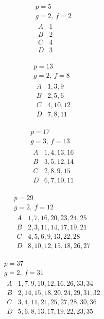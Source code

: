 \[
\begin{gathered}
p=5\\
g=2,\ f=2\\[3pt]
\begin{array}{c|l}
A&1\\
B&2\\
C&4\\
D&3
\end{array}
\end{gathered}
\]

\[
\begin{gathered}
p=13\\
g=2,\ f=8\\[3pt]
\begin{array}{c|l}
A&1,3,9\\
B&2,5,6\\
C&4,10,12\\
D&7,8,11
\end{array}
\end{gathered}
\]

\[
\begin{gathered}
p=17\\
g=3,\ f=13\\[3pt]
\begin{array}{c|l}
A&1,4,13,16\\
B&3,5,12,14\\
C&2,8,9,15\\
D&6,7,10,11
\end{array}
\end{gathered}
\]

\[
\begin{gathered}
p=29\\
g=2,\ f=12\\[3pt]
\begin{array}{c|l}
A&1,7,16,20,23,24,25\\
B&2,3,11,14,17,19,21\\
C&4,5,6,9,13,22,28\\
D&8,10,12,15,18,26,27
\end{array}
\end{gathered}
\]

%
\[
\begin{gathered}
p=37\\
g=2,\ f=31\\[3pt]
\begin{array}{c|l}
A&1,7,9,10,12,16,26,33,34\\
B&2,14,15,18,20,24,29,31,32\\
C&3,4,11,21,25,27,28,30,36\\
D&5,6,8,13,17,19,22,23,35
\end{array}
\end{gathered}
\]

